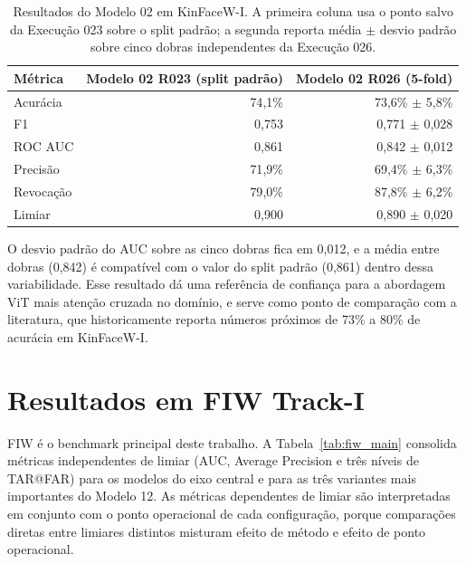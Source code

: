 \begin{table}[h]
\centering
\caption{Resultados do Modelo 02 em KinFaceW-I. A primeira coluna usa o ponto salvo da Execução 023 sobre o split padrão; a segunda reporta média $\pm$ desvio padrão sobre cinco dobras independentes da Execução 026.}
\label{tab:kinface_resultados}
\begin{tabular}{lrr}
\hline
\textbf{Métrica} & \textbf{Modelo 02 R023 (split padrão)} & \textbf{Modelo 02 R026 (5-fold)} \\
\hline
Acurácia   & 74{,}1\% & 73{,}6\% $\pm$ 5{,}8\% \\
F1         & 0{,}753  & 0{,}771 $\pm$ 0{,}028 \\
ROC AUC    & 0{,}861  & 0{,}842 $\pm$ 0{,}012 \\
Precisão  & 71{,}9\% & 69{,}4\% $\pm$ 6{,}3\% \\
Revocação & 79{,}0\% & 87{,}8\% $\pm$ 6{,}2\% \\
Limiar     & 0{,}900  & 0{,}890 $\pm$ 0{,}020 \\
\hline
\end{tabular}
\end{table}

O desvio padrão do AUC sobre as cinco dobras fica em 0,012, e a média entre dobras (0,842) é compatível com o valor do split padrão (0,861) dentro dessa variabilidade. Esse resultado dá uma referência de confiança para a abordagem ViT mais atenção cruzada no domínio, e serve como ponto de comparação com a literatura, que historicamente reporta números próximos de 73\% a 80\% de acurácia em KinFaceW-I.

\section{Resultados em FIW Track-I}

FIW é o benchmark principal deste trabalho. A Tabela~\ref{tab:fiw_main} consolida métricas independentes de limiar (AUC, Average Precision e três níveis de TAR@FAR) para os modelos do eixo central e para as três variantes mais importantes do Modelo 12. As métricas dependentes de limiar são interpretadas em conjunto com o ponto operacional de cada configuração, porque comparações diretas entre limiares distintos misturam efeito de método e efeito de ponto operacional.

